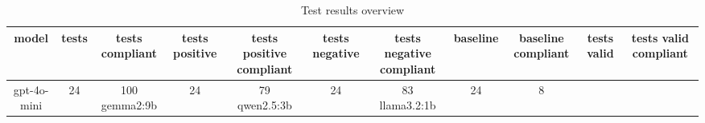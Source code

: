 
  \begin{table}[h!]
  \centering
  \begin{tabular}{|c|c|c|c|c|c|c|c|c|c|c|}
  \hline
  model & tests & tests compliant & tests positive & tests positive compliant & tests negative & tests negative compliant & baseline & baseline compliant & tests valid & tests valid compliant \\
  \hline
  gpt-4o-mini & 24 & 100%
\hline
gemma2:9b & 24 & 79%
\hline
qwen2.5:3b & 24 & 83%
\hline
llama3.2:1b & 24 & 8%
  \end{tabular}
  \caption{Test results overview}
  
  \end{table}
  